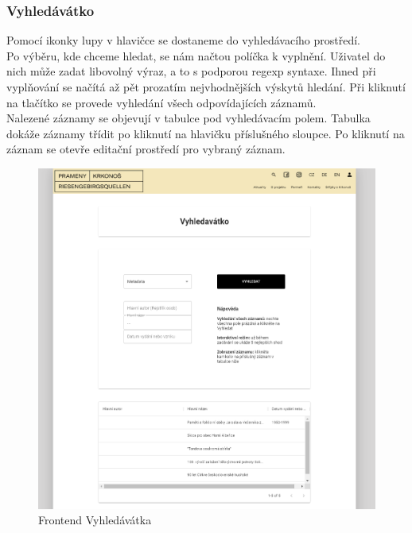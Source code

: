 \subsubsection{Vyhledávátko}
Pomocí ikonky lupy v hlavičce se dostaneme do vyhledávacího prostředí.\\
Po výběru, kde chceme hledat, se nám načtou políčka k vyplnění. Uživatel do nich může zadat
libovolný výraz, a to s podporou regexp syntaxe. Ihned při vyplňování se načítá až pět
prozatím nejvhodnějších výskytů hledání. Při kliknutí na tlačítko  se provede
vyhledání všech odpovídajících záznamů.\\
Nalezené záznamy se objevují v tabulce pod vyhledávacím polem.
Tabulka dokáže záznamy třídit po kliknutí na hlavičku příslušného sloupce.
Po kliknutí na záznam se otevře editační prostředí pro vybraný záznam.
\begin{figure}[H]
	\centering
	\includegraphics[width=.8\linewidth]{img/searchScene.png}
	\caption{Frontend Vyhledávátka}
\end{figure}

